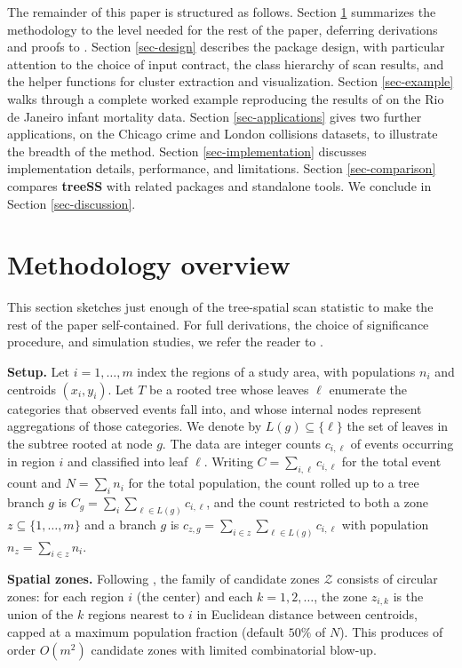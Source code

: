 The remainder of this paper is structured as follows. Section
\ref{sec-methodology} summarizes the methodology to the level needed for
the rest of the paper, deferring derivations and proofs to \citet{cancado2025}.
Section \ref{sec-design} describes the package design, with particular
attention to the choice of input contract, the class hierarchy of scan
results, and the helper functions for cluster extraction and visualization.
Section \ref{sec-example} walks through a complete worked example
reproducing the results of \citet{cancado2025} on the Rio de Janeiro infant
mortality data. Section \ref{sec-applications} gives two further
applications, on the Chicago crime and London collisions datasets, to
illustrate the breadth of the method. Section \ref{sec-implementation}
discusses implementation details, performance, and limitations. Section
\ref{sec-comparison} compares \textbf{treeSS} with related packages and
standalone tools. We conclude in Section \ref{sec-discussion}.

\hypertarget{sec-methodology}{%
\section{Methodology overview}\label{sec-methodology}}

This section sketches just enough of the tree-spatial scan statistic to make
the rest of the paper self-contained. For full derivations, the choice of
significance procedure, and simulation studies, we refer the reader to
\citet{cancado2025}.

\textbf{Setup.} Let \(i = 1, \ldots, m\) index the regions of a study area, with
populations \(n_i\) and centroids \((x_i, y_i)\). Let \(T\) be a rooted tree whose
leaves \(\ell\) enumerate the categories that observed events fall into, and
whose internal nodes represent aggregations of those categories. We denote
by \(L(g) \subseteq \{\ell\}\) the set of leaves in the subtree rooted at
node \(g\). The data are integer counts \(c_{i,\ell}\) of events occurring in
region \(i\) and classified into leaf \(\ell\). Writing \(C = \sum_{i,\ell} c_{i,\ell}\) for the total event count and \(N = \sum_i n_i\) for the total
population, the count rolled up to a tree branch \(g\) is
\(C_g = \sum_i \sum_{\ell \in L(g)} c_{i,\ell}\), and the count restricted to
both a zone \(z \subseteq \{1,\ldots,m\}\) and a branch \(g\) is
\(c_{z,g} = \sum_{i \in z} \sum_{\ell \in L(g)} c_{i,\ell}\) with population
\(n_z = \sum_{i \in z} n_i\).

\textbf{Spatial zones.} Following \citet{kulldorff1997}, the family of candidate zones
\(\mathcal{Z}\) consists of circular zones: for each region \(i\) (the center)
and each \(k = 1, 2, \ldots\), the zone \(z_{i,k}\) is the union of the \(k\)
regions nearest to \(i\) in Euclidean distance between centroids, capped at a
maximum population fraction (default \(50\%\) of \(N\)). This produces of order
\(O(m^2)\) candidate zones with limited combinatorial blow-up.


